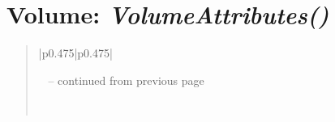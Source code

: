 \documentclass[letterpaper,10pt,english]{sphinxmanual}
\begin{document}
\begin{DUlineblock}{0em}
\item[] 
\end{DUlineblock}

\begin{DUlineblock}{0em}
\item[] 
\end{DUlineblock}


\section{\textbf{Volume}: \emph{VolumeAttributes()}}
\label{attributes:volume-volumeattributes}
\begin{DUlineblock}{0em}
\item[] 
\end{DUlineblock}
\begin{quote}

\begin{longtable}{|p{0.475\linewidth}|p{0.475\linewidth}|}
\hline
\endfirsthead

%
{{\textsf{\tablename\ \thetable{} -- continued from previous page}}} \\
\hline
\endhead

\hline {} \\ \hline
\endfoot

\endlastfoot



\end{longtable}
\end{quote}
\end{document}
